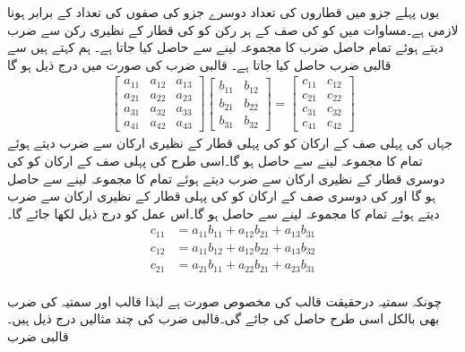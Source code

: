 یوں پہلے جزو  میں قطاروں کی تعداد  دوسرے جزو  کی صفوں کی تعداد  کے برابر ہونا لازمی ہے۔مساوات  میں  کو  کی   صف کے ہر رکن کو  کی  قطار کے نظیری رکن سے ضرب دیتے ہوئے تمام  حاصل ضرب کا مجموعہ لینے سے حاصل کیا جاتا ہے۔ ہم کہتے ہیں  سے قالبی ضرب حاصل کیا جاتا ہے۔ قالبی ضرب  کی صورت میں درج ذیل ہو گا
\begin{align*}
\begin{bmatrix}
a_{11}& a_{12} & a_{13}\\
a_{21}& a_{22} & a_{23}\\
a_{31}& a_{32} & a_{33}\\
a_{41} & a_{42} & a_{43}
\end{bmatrix}
\begin{bmatrix}
b_{11}& b_{12}\\
b_{21}& b_{22}\\
b_{31}& b_{32}
\end{bmatrix}=
\begin{bmatrix}
c_{11} & c_{12}\\
c_{21} & c_{22}\\
c_{31} & c_{32}\\
c_{41} & c_{42}
\end{bmatrix}
\end{align*}
جہاں  کی پہلی صف کے ارکان کو  کی پہلی قطار کے نظیری ارکان سے ضرب دیتے ہوئے تمام کا مجموعہ لینے سے  حاصل ہو گا۔اسی طرح  کی پہلی صف کے ارکان کو  کی دوسری قطار کے نظیری ارکان سے ضرب دیتے ہوئے تمام کا مجموعہ لینے سے  حاصل ہو گا اور   کی دوسری صف کے ارکان کو  کی پہلی قطار کے نظیری ارکان سے ضرب دیتے ہوئے تمام کا مجموعہ لینے سے  حاصل ہو گا۔اس عمل کو درج ذیل لکھا جائے گا۔
\begin{align*}
c_{11}&=a_{11}b_{11}+a_{12}b_{21}+a_{13}b_{31}\\
c_{12}&=a_{11}b_{12}+a_{12}b_{22}+a_{13}b_{32}\\
c_{21}&=a_{21}b_{11}+a_{22}b_{21}+a_{23}b_{31}\\
\end{align*}
 
چونکہ سمتیہ درحقیقت قالب کی مخصوص صورت ہے لہٰذا قالب اور سمتیہ کی ضرب بھی بالکل اسی طرح حاصل کی جائے گی۔قالبی ضرب کی چند مثالیں درج ذیل ہیں۔
\quad قالبی ضرب\\

